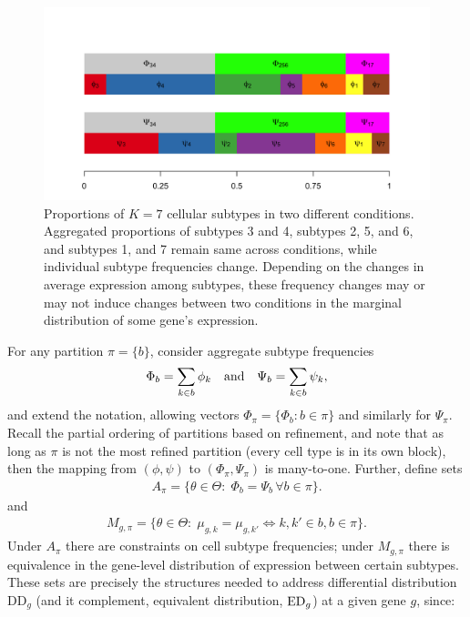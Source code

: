 \documentclass[aoas,preprint]{imsart}
\begin{document}
\begin{figure}[h!]
  \includegraphics[width=\linewidth]{Figs/schematic-1.png}
  \caption{Proportions of $K=7$ cellular subtypes in two different conditions. 
 Aggregated proportions of subtypes 3 and 4, subtypes 2, 5, and 6, and subtypes 1, and 7 
 remain same across conditions, while individual subtype frequencies change. 
 Depending on the changes in average expression among subtypes, these frequency changes
may or may not induce changes between two conditions  in the  marginal distribution of some gene's expression.  }
  \label{fig:scheme}
\end{figure}


For any partition $\pi=\{b\}$, consider aggregate subtype frequencies
\begin{eqnarray*}
\Phi_b = \sum_{k\in b} \phi_k \quad {\mbox {\rm  and}} \quad 
 \Psi_b = \sum_{k\in b} \psi_k,
\end{eqnarray*}
and extend the notation, allowing vectors $\Phi_\pi = \{ \Phi_b: b \in \pi \}$ and similarly
for $\Psi_\pi$. Recall the partial ordering of partitions based on refinement, and note that
as long as $\pi$ is not the most refined partition (every cell type is in its own block),
then the mapping from $( \phi, \psi )$ to $( \Phi_\pi, \Psi_\pi)$ is many-to-one.
Further, define sets
\begin{eqnarray}
\label{eq:asets}
A_\pi = \{ \theta\in \Theta: \; \Phi_b = \Psi_b  \, \forall b \in \pi \}.
\end{eqnarray}
and
\begin{eqnarray}
\label{eq:msets}
M_{g,\pi} = \{ \theta \in \Theta: \; \mu_{g,k} = \mu_{g,k'} \iff k,k' \in b, b \in \pi \}.
\end{eqnarray}
Under $A_\pi$ there are constraints on cell subtype frequencies; under $M_{g,\pi}$ there is 
equivalence in the gene-level distribution of expression between certain subtypes.
These sets are precisely the
structures needed to address differential distribution DD$_g$ (and
it complement, equivalent distribution, ${\rm ED}_g$) at a given gene
$g$, since:
\end{document}
